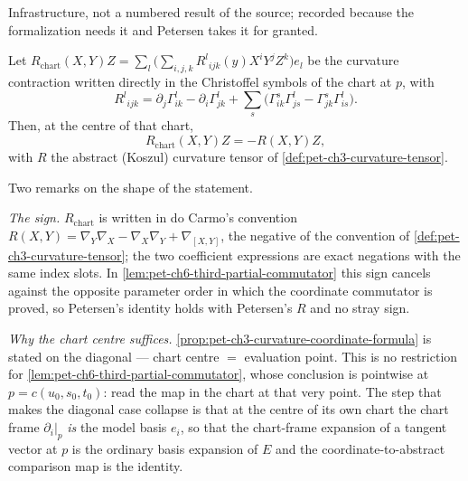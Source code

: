 \begin{lemma}
  \label{lem:curvature-chart-bridge}


  Infrastructure, not a numbered result of the source; recorded because the
  formalization needs it and Petersen takes it for granted.

  Let $R_{\mathrm{chart}}(X,Y)Z=\sum_l\big(\sum_{i,j,k}R^l{}_{ijk}(y)X^iY^jZ^k\big)e_l$
  be the curvature contraction written directly in the Christoffel symbols of the
  chart at $p$, with
  \[
    R^l{}_{ijk}=\partial_j\Gamma^l_{ik}-\partial_i\Gamma^l_{jk}
      +\sum_s\big(\Gamma^s_{ik}\Gamma^l_{js}-\Gamma^s_{jk}\Gamma^l_{is}\big).
  \]
  Then, at the centre of that chart,
  \[
    R_{\mathrm{chart}}(X,Y)Z=-R(X,Y)Z,
  \]
  with $R$ the abstract (Koszul) curvature tensor of \cref{def:pet-ch3-curvature-tensor}.

  Two remarks on the shape of the statement.

  \emph{The sign.} $R_{\mathrm{chart}}$ is written in do Carmo's convention
  $R(X,Y)=\nabla_Y\nabla_X-\nabla_X\nabla_Y+\nabla_{[X,Y]}$, the negative of the
  convention of \cref{def:pet-ch3-curvature-tensor}; the two coefficient
  expressions are exact negations with the same index slots. In
  \cref{lem:pet-ch6-third-partial-commutator} this sign cancels against the
  opposite parameter order in which the coordinate commutator is proved, so
  Petersen's identity holds with Petersen's $R$ and no stray sign.

  \emph{Why the chart centre suffices.}
  \cref{prop:pet-ch3-curvature-coordinate-formula} is stated on the diagonal —
  chart centre $=$ evaluation point. This is no restriction for
  \cref{lem:pet-ch6-third-partial-commutator}, whose conclusion is pointwise at
  $p=c(u_0,s_0,t_0)$: read the map in the chart at that very point. The step that
  makes the diagonal case collapse is that at the centre of its own chart the
  chart frame $\partial_i|_p$ \emph{is} the model basis $e_i$, so that the
  chart-frame expansion of a tangent vector at $p$ is the ordinary basis expansion
  of $E$ and the coordinate-to-abstract comparison map is the identity.
\end{lemma}

